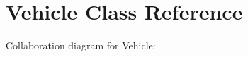 \hypertarget{class_vehicle}{}\section{Vehicle Class Reference}
\label{class_vehicle}


Collaboration diagram for Vehicle\+:
